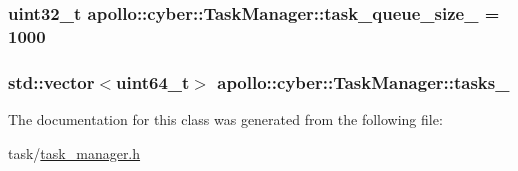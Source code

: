 \hypertarget{classapollo_1_1cyber_1_1TaskManager_a7a3ac7bab5bd60004dc4ad9bed645d8c}{
\subsubsection[{task\-\_\-queue\-\_\-size\-\_\-}]{\setlength{\rightskip}{0pt plus 5cm}uint32\-\_\-t apollo\-::cyber\-::\-Task\-Manager\-::task\-\_\-queue\-\_\-size\-\_\- = 1000\hspace{0.3cm}{\ttfamily [private]}}}\label{classapollo_1_1cyber_1_1TaskManager_a7a3ac7bab5bd60004dc4ad9bed645d8c}
\hypertarget{classapollo_1_1cyber_1_1TaskManager_a8057f1e4981b8dc2a0af8c615f4d24c6}{
\subsubsection[{tasks\-\_\-}]{\setlength{\rightskip}{0pt plus 5cm}std\-::vector$<$uint64\-\_\-t$>$ apollo\-::cyber\-::\-Task\-Manager\-::tasks\-\_\-\hspace{0.3cm}{\ttfamily [private]}}}\label{classapollo_1_1cyber_1_1TaskManager_a8057f1e4981b8dc2a0af8c615f4d24c6}


The documentation for this class was generated from the following file\-:\begin{DoxyCompactItemize}
\item 
task/\hyperlink{task__manager_8h}{task\-\_\-manager.\-h}\end{DoxyCompactItemize}
